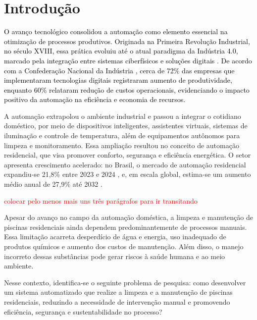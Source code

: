 \chapter{Introdução}

\textcolor{black}{O avanço tecnológico consolidou a automação como elemento essencial na otimização de processos produtivos. Originada na Primeira Revolução Industrial, no século XVIII, essa prática evoluiu até o atual paradigma da Indústria 4.0, marcado pela integração entre sistemas ciberfísicos e soluções digitais \cite{automacao}. De acordo com a Confederação Nacional da Indústria \cite{CNI}, cerca de 72\% das empresas que implementaram tecnologias digitais registraram aumento de produtividade, enquanto 60\% relataram redução de custos operacionais, evidenciando o impacto positivo da automação na eficiência e economia de recursos.}

A automação extrapolou o ambiente industrial e passou a integrar o cotidiano doméstico, por meio de dispositivos inteligentes, assistentes virtuais, sistemas de iluminação e controle de temperatura, além de equipamentos autônomos para limpeza e monitoramento. Essa ampliação resultou no conceito de automação residencial, que visa promover conforto, segurança e eficiência energética. O setor apresenta crescimento acelerado: no Brasil, o mercado de automação residencial expandiu-se 21,8\% entre 2023 e 2024 \cite{cresceuBR}, e, em escala global, estima-se um aumento médio anual de 27,9\% até 2032 \cite{aumentoAosAnos}.


\textcolor{red}{colocar pelo menos mais uns três parágrafos para ir transitando}

Apesar do avanço no campo da automação doméstica, a limpeza e manutenção de piscinas residenciais ainda dependem predominantemente de processos manuais. Essa limitação acarreta desperdício de água e energia, uso inadequado de produtos químicos e aumento dos custos de manutenção. Além disso, o manejo incorreto dessas substâncias pode gerar riscos à saúde humana e ao meio ambiente.

Nesse contexto, identifica-se o seguinte problema de pesquisa: como desenvolver um sistema automatizado que realize a limpeza e a manutenção de piscinas residenciais, reduzindo a necessidade de intervenção manual e promovendo eficiência, segurança e sustentabilidade no processo?

